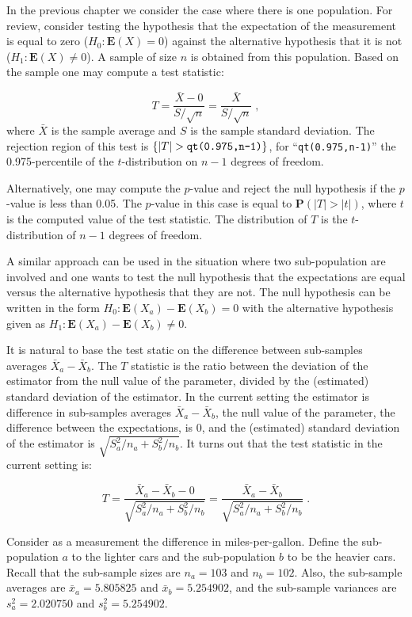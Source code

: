 \documentclass[
]{krantz}
\newcommand{\Expec}{\mathbf{E}}
\newcommand{\Prob}{\mathbf{P}}
\theoremstyle{definition}
\theoremstyle{definition}
\theoremstyle{definition}
\theoremstyle{remark}
\begin{document}
In the previous chapter we consider the case where there is one
population. For review, consider testing the hypothesis that the
expectation of the measurement is equal to zero (\(H_0: \Expec(X) = 0\))
against the alternative hypothesis that it is not
(\(H_1: \Expec(X) \not = 0\)). A sample of size \(n\) is obtained from this
population. Based on the sample one may compute a test statistic:

\[T = \frac{\bar X - 0}{S/\sqrt{n}} = \frac{\bar X}{S/\sqrt{n}}\;,\]
where \(\bar X\) is the sample average and \(S\) is the sample standard
deviation. The rejection region of this test is
\(\{|T| > \mbox{\texttt{qt(0.975,n-1)}}\}\), for ``\texttt{qt(0.975,n-1)}'' the
0.975-percentile of the \(t\)-distribution on \(n-1\) degrees of freedom.

Alternatively, one may compute the \(p\)-value and reject the null
hypothesis if the \(p\)-value is less than 0.05. The \(p\)-value in this
case is equal to \(\Prob(|T| > |t|)\), where \(t\) is the computed value of
the test statistic. The distribution of \(T\) is the \(t\)-distribution of
\(n-1\) degrees of freedom.

A similar approach can be used in the situation where two sub-population
are involved and one wants to test the null hypothesis that the
expectations are equal versus the alternative hypothesis that they are
not. The null hypothesis can be written in the form
\(H_0:\Expec(X_a) - \Expec(X_b) = 0\) with the alternative hypothesis
given as \(H_1:\Expec(X_a) - \Expec(X_b) \not = 0\).

It is natural to base the test static on the difference between
sub-samples averages \(\bar X_a - \bar X_b\). The \(T\) statistic is the
ratio between the deviation of the estimator from the null value of the
parameter, divided by the (estimated) standard deviation of the
estimator. In the current setting the estimator is difference in
sub-samples averages \(\bar X_a - \bar X_b\), the null value of the
parameter, the difference between the expectations, is 0, and the
(estimated) standard deviation of the estimator is
\(\sqrt{S_a^2/n_a + S_b^2/n_b}\). It turns out that the test statistic in
the current setting is:

\[T = \frac{\bar X_a - \bar X_b - 0}{ \sqrt{S_a^2/n_a + S^2_b/n_b}} = \frac{\bar X_a - \bar X_b}{ \sqrt{S_a^2/n_a + S^2_b/n_b}}\;.\]

Consider as a measurement the difference in miles-per-gallon. Define the
sub-population \(a\) to the lighter cars and the sub-population \(b\) to be
the heavier cars. Recall that the sub-sample sizes are \(n_a =103\) and
\(n_b=102\). Also, the sub-sample averages are \(\bar x_a = 5.805825\) and
\(\bar x_b =5.254902\), and the sub-sample variances are
\(s^2_a = 2.020750\) and \(s_b^2 = 5.254902\).
\end{document}

